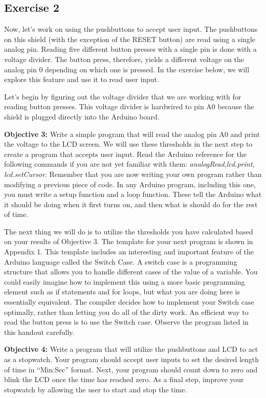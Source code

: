 \documentclass[10pt]{report}
\begin{document}
\subsection*{Exercise 2}
\par 
Now, let’s work on using the pushbuttons to accept user input. The pushbuttons on this shield (with the exception of the RESET button) are read using a single analog pin. Reading five different button presses with a single pin is done with a voltage divider. The button press, therefore, yields a different voltage on the analog pin 0 depending on which one is pressed. In the exercise below, we will explore this feature and use it to read user input. 
\par
 Let’s begin by figuring out the voltage divider that we are working with for reading button presses. This voltage divider is hardwired to pin A0 because the shield is plugged directly into the Arduino board. 
\par
\textbf{Objective 3:} Write a simple program that will read the analog pin A0 and print the voltage to the LCD screen. We will use these thresholds in the next step to create a program that accepts user input. Read the Arduino reference for the following commands if you are not yet familiar with them: \emph{ analogRead},\emph{lcd.print}, \emph{lcd.setCursor}. Remember that you are now writing your own program rather than modifying a previous piece of code. In any Arduino program, including this one, you must write a setup function and a loop function. These tell the Arduino what it should be doing when it first turns on, and then what is should do for the rest of time. 
\par
The next thing we will do is to utilize the thresholds you have calculated based on your results of Objective 3. The template for your next program is shown in Appendix 1. This template includes an interesting and important feature of the Arduino language called the Switch Case. A switch case is a programming structure that allows you to handle different cases of the value of a variable. You could easily imagine how to implement this using a more basic programming element such as if statements and for loops, but what you are doing here is essentially equivalent. The compiler decides how to implement your Switch case optimally, rather than letting you do all of the dirty work. An efficient way to read the button press is to use the Switch case. Observe the program listed in this handout carefully.
\par
\textbf{Objective 4:} Write a program that will utilize the pushbuttons and LCD to act as a stopwatch. Your program should accept user inputs to set the desired length of time in “Min:Sec” format. Next, your program should count down to zero and blink the LCD once the time has reached zero. As a final step, improve your stopwatch by allowing the user to start and stop the time.
\end{document}
